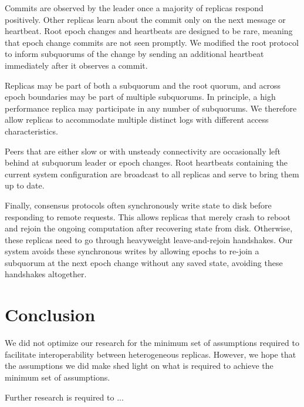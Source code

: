 Commits are observed by the leader once a majority of replicas respond
positively.
Other replicas learn about the commit only on the next message or heartbeat.
Root epoch changes and heartbeats are designed to be rare, meaning that epoch
change commits are not seen promptly.
We modified the root protocol to inform subquorums of the change by sending an
additional heartbeat immediately after it observes a commit.

Replicas may be part of both a subquorum and the root quorum, and across epoch boundaries
may be part of multiple subquorums.
In principle, a high performance replica may participate in any number of
subquorums.
We therefore allow replicas to accommodate multiple distinct logs with
different access characteristics.

Peers that are either slow or with unsteady connectivity are occasionally left
behind at subquorum leader or epoch changes.
Root heartbeats containing the current system configuration are broadcast to
all replicas and serve to bring them up to date.

Finally, consensus protocols often synchronously write state to disk before
responding to remote requests.
This allows replicas that merely crash to reboot and rejoin the ongoing
computation after recovering state from disk.
Otherwise, these replicas need to go through heavyweight leave-and-rejoin
handshakes.
Our system avoids these synchronous writes by allowing epochs to re-join a
subquorum at the next epoch change without any saved state, avoiding these
handshakes altogether.

\section{Conclusion}

We did not optimize our research for the minimum set of assumptions required to facilitate interoperability between heterogeneous replicas.
However, we hope that the assumptions we did make shed light on what is required to achieve the minimum set of assumptions.

Further research is required to ...
